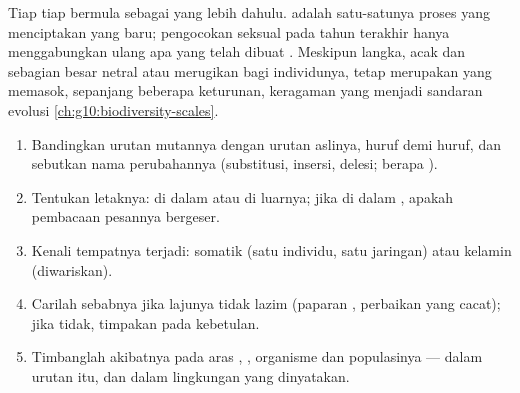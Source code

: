 \begin{proposition}\label{prop:g11:mutations:source}
Tiap  tiap  bermula sebagai   yang lebih dahulu.
 adalah satu-satunya proses yang menciptakan 
yang baru; pengocokan seksual pada tahun terakhir hanya menggabungkan
ulang apa yang telah dibuat . Meskipun langka, acak dan sebagian
besar netral atau merugikan bagi individunya,  tetap merupakan
yang memasok, sepanjang beberapa keturunan, keragaman yang menjadi
sandaran evolusi \cref{ch:g10:biodiversity-scales}.
\end{proposition}
\admitted

\begin{method}\label{met:g11:mutations:analyse}
\begin{enumerate}
  \item Bandingkan urutan mutannya dengan urutan aslinya, huruf demi
        huruf, dan sebutkan nama perubahannya (substitusi, insersi,
        delesi; berapa ).
  \item Tentukan letaknya: di dalam  atau di luarnya; jika di dalam
        , apakah pembacaan pesannya bergeser.
  \item Kenali  tempatnya terjadi: somatik (satu individu, satu
        jaringan) atau  kelamin (diwariskan).
  \item Carilah sebabnya jika lajunya tidak lazim (paparan ,
        perbaikan yang cacat); jika tidak, timpakan pada kebetulan.
  \item Timbanglah akibatnya pada aras , , organisme dan
        populasinya --- dalam urutan itu, dan dalam lingkungan yang
        dinyatakan.
\end{enumerate}
\end{method}

